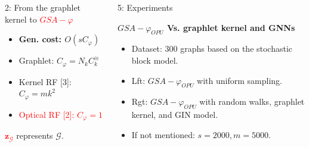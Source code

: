 \documentclass[final,dvipsnames]{beamer}
\newcommand{\vsp}{\vspace{10pt}}
\newcommand{\myemph}[1]{\textcolor{red}{#1}}
\begin{document}
\begin{frame}{}
\begin{columns}[t]
\begin{column}{0.45\linewidth}
\begin{block}{2: From the graphlet kernel to \myemph{$GSA-\varphi$}}
{}
\hfill
\parbox{0.35\textwidth}{
	\large
	\begin{itemize}
		\item  \textbf{Gen. cost: $O(s C_{\varphi})$}
		\vsp\vsp
		\item Graphlet: $C_\varphi = N_k C^{\cong}_k$
		\vsp\vsp
		\item Kernel RF [3]: $C_\varphi = m k^2$
		\vsp\vsp
		\item \myemph{Optical RF [2]: $C_\varphi = 1$}
	\end{itemize}
}

\vspace{1cm}
\large
\hspace {12cm}\myemph{$\mathbf{z}_\mathcal{G}$ }represents $\mathcal{G}$.
\end{block}

\end{column}









\begin{column}{0.29\linewidth}
	
	
\begin{myalertblock}{5: Experiments}
\vspace{0.5cm}

\hspace*{.0\linewidth}\begin{minipage}{.99\linewidth}
	\begin{mynotablock}{\textbf{$GSA-\varphi_{OPU}$ Vs. graphlet kernel and GNNs}}
		\small
		\begin{itemize}
			\item Dataset: 300 graphs based on the stochastic block model.
			\item Lft: $GSA-\varphi_{OPU}$ with uniform sampling. 
			\item Rgt: $GSA-\varphi_{OPU}$ with random walks, graphlet kernel, and GIN model.
			\item If not mentioned: $s= 2000, m=5000$.
			

\end{itemize}
\end{mynotablock}
\end{minipage}
\end{myalertblock}
\end{column}
\end{columns}
\end{frame}
\end{document}
